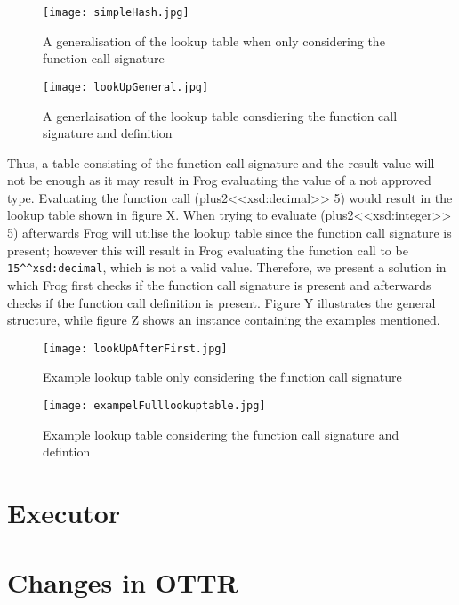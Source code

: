 \begin{figure}
    \centering
    \begin{minipage}{.5\textwidth}
      \centering
      \texttt{[image: simpleHash.jpg]}
      \caption{A generalisation of the lookup table when only considering the function call signature}
      \label{fig:simpleHash}
    \end{minipage}%
    \begin{minipage}{.5\textwidth}
      \centering
      \texttt{[image: lookUpGeneral.jpg]}
      \caption{A generlaisation of the lookup table consdiering the function call signature and definition}
      \label{fig:lookUpGeneral}
    \end{minipage}
\end{figure}

\para
Thus, a table consisting of the function call signature and the result value will not be enough as it may result in Frog evaluating the value of a not approved type. Evaluating the function call (plus2<<xsd:decimal>> 5) would result in the lookup table shown in figure X. When trying to evaluate (plus2<<xsd:integer>> 5) afterwards Frog will utilise the lookup table since the function call signature is present; however this will result in Frog evaluating the function call to be \lstinline{15^^xsd:decimal}, which is not a valid value. Therefore, we present a solution in which Frog first checks if the function call signature is present and afterwards checks if the function call definition is present. Figure Y illustrates the general structure, while figure Z shows an instance containing the examples mentioned. 

\begin{figure}
    \centering
    \begin{minipage}{.5\textwidth}
      \centering
      \texttt{[image: lookUpAfterFirst.jpg]}
      \caption{Example lookup table only considering the function call signature}
      \label{fig:lookUpAfterFirst}
    \end{minipage}%
    \begin{minipage}{.5\textwidth}
      \centering
      \texttt{[image: exampelFulllookuptable.jpg]}
      \caption{Example lookup table considering the function call signature and defintion}
      \label{fig:exampelFulllookuptable}
    \end{minipage}
\end{figure}

\section{Executor}

\section{Changes in OTTR}

